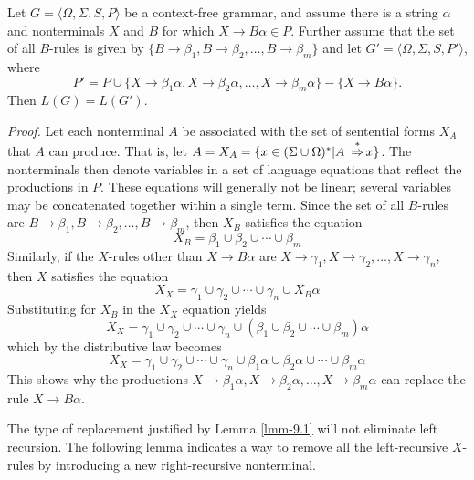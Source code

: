 \begin{lmm}\label{lmm-9.1}
Let $G=\langle\Omega,\Sigma,S,P\rangle$ be a context-free grammar, and assume
there is a string $\alpha$ and nonterminals $X$ and $B$ for which $X\rightarrow
B\alpha\in P$. Further assume that the set of all $B$-rules is given by $\{B
\rightarrow\beta_1,B\rightarrow\beta_2,\ldots,B\rightarrow\beta_m\}$ and let
$G'=\langle\Omega,\Sigma,S,P'\rangle$, where
\[ P'=P\cup\{X\rightarrow\beta_1\alpha,X\rightarrow\beta_2\alpha,\ldots,X
	\rightarrow\beta_m\alpha\} - \{X\rightarrow B\alpha\}. \]
Then $L(G) = L(G')$.

\emph{Proof.} Let each nonterminal $A$ be associated with the set of sentential
forms $X_A$ that $A$ can produce. That is, let $A=X_A=\{x\in(\Sigma\cup\Omega)^*|
 A\ \operatorname{\overset{*}{\Rightarrow}} x\}$. The nonterminals then denote variables in a set of language
equations that reflect the productions in $P$. These equations will generally
not be linear; several variables may be concatenated together within a single
term. Since the set of all $B$-rules are $B\rightarrow\beta_1,B\rightarrow
\beta_2,\ldots,B\rightarrow\beta_m$, then $X_B$ satisfies the equation
\[ X_B = \beta_1 \cup \beta_2 \cup \cdots \cup \beta_m \]
Similarly, if the $X$-rules other than $X\rightarrow B\alpha$ are $X\rightarrow
\gamma_1,X\rightarrow \gamma_2,\ldots,X\rightarrow\gamma_n$, then $X$ satisfies
the equation
\[ X_X = \gamma_1\cup\gamma_2\cup\cdots\cup\gamma_n\cup X_B\alpha \]
Substituting for $X_B$ in the $X_X$ equation yields
\[ X_X = \gamma_1\cup\gamma_2\cup\cdots\cup\gamma_n\cup(\beta_1\cup\beta_2\cup
	\cdots\cup\beta_m)\alpha \]
which by the distributive law becomes
\[ X_X = \gamma_1\cup\gamma_2\cup\cdots\cup\gamma_n\cup\beta_1\alpha\cup\beta_2
	\alpha\cup\cdots\cup\beta_m\alpha \]
This shows why the productions $X\rightarrow\beta_1\alpha,X\rightarrow\beta_2
\alpha, \ldots ,X\rightarrow\beta_m\alpha$ can replace the rule $X\rightarrow B
\alpha$.
\end{lmm}
The type of replacement justified by Lemma \ref{lmm-9.1} will not eliminate left recursion.
The following lemma indicates a way to remove all the left-recursive $X$-rules
by introducing a new right-recursive nonterminal.

